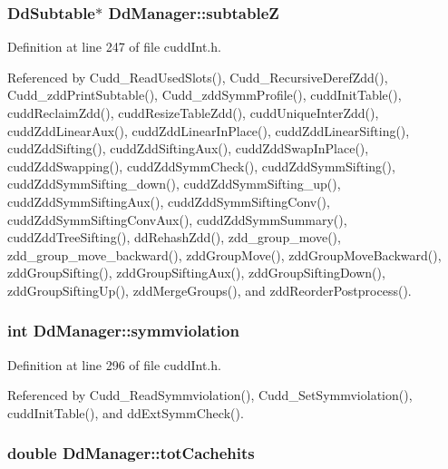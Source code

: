\subsubsection{\setlength{\rightskip}{0pt plus 5cm}\bf{Dd\-Subtable}$\ast$ \bf{Dd\-Manager::subtable\-Z}}\label{structDdManager_7e75a8f45ea61dd45c34b114a0f22a34}




Definition at line 247 of file cudd\-Int.h.

Referenced by Cudd\_\-Read\-Used\-Slots(), Cudd\_\-Recursive\-Deref\-Zdd(), Cudd\_\-zdd\-Print\-Subtable(), Cudd\_\-zdd\-Symm\-Profile(), cudd\-Init\-Table(), cudd\-Reclaim\-Zdd(), cudd\-Resize\-Table\-Zdd(), cudd\-Unique\-Inter\-Zdd(), cudd\-Zdd\-Linear\-Aux(), cudd\-Zdd\-Linear\-In\-Place(), cudd\-Zdd\-Linear\-Sifting(), cudd\-Zdd\-Sifting(), cudd\-Zdd\-Sifting\-Aux(), cudd\-Zdd\-Swap\-In\-Place(), cudd\-Zdd\-Swapping(), cudd\-Zdd\-Symm\-Check(), cudd\-Zdd\-Symm\-Sifting(), cudd\-Zdd\-Symm\-Sifting\_\-down(), cudd\-Zdd\-Symm\-Sifting\_\-up(), cudd\-Zdd\-Symm\-Sifting\-Aux(), cudd\-Zdd\-Symm\-Sifting\-Conv(), cudd\-Zdd\-Symm\-Sifting\-Conv\-Aux(), cudd\-Zdd\-Symm\-Summary(), cudd\-Zdd\-Tree\-Sifting(), dd\-Rehash\-Zdd(), zdd\_\-group\_\-move(), zdd\_\-group\_\-move\_\-backward(), zdd\-Group\-Move(), zdd\-Group\-Move\-Backward(), zdd\-Group\-Sifting(), zdd\-Group\-Sifting\-Aux(), zdd\-Group\-Sifting\-Down(), zdd\-Group\-Sifting\-Up(), zdd\-Merge\-Groups(), and zdd\-Reorder\-Postprocess().
\subsubsection{\setlength{\rightskip}{0pt plus 5cm}int \bf{Dd\-Manager::symmviolation}}\label{structDdManager_4a8e54350702f269411399762cb958e1}




Definition at line 296 of file cudd\-Int.h.

Referenced by Cudd\_\-Read\-Symmviolation(), Cudd\_\-Set\-Symmviolation(), cudd\-Init\-Table(), and dd\-Ext\-Symm\-Check().
\subsubsection{\setlength{\rightskip}{0pt plus 5cm}double \bf{Dd\-Manager::tot\-Cachehits}}\label{structDdManager_6aad2eeab12f04c283c6baa26d325924}




